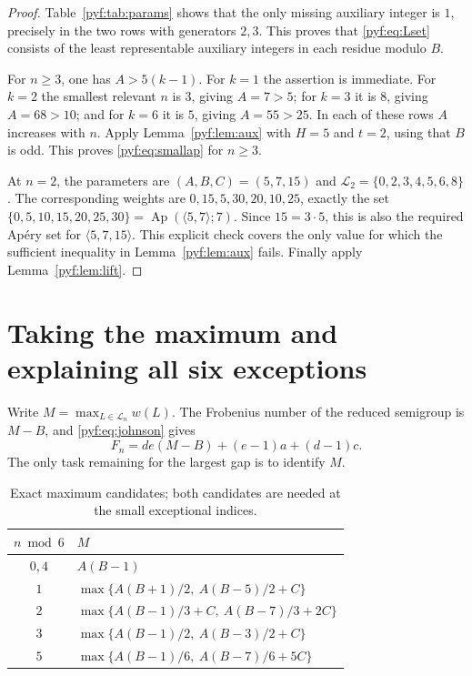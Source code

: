 \documentclass[11pt,a4paper]{article}
\numberwithin{equation}{section}
\theoremstyle{definition}
\newcommand{\Ap}{\operatorname{Ap}}
\begin{document}
\begin{proof}
Table~\ref{pyf:tab:params} shows that the only missing auxiliary integer is
$1$, precisely in the two rows with generators $2,3$. This proves that
\eqref{pyf:eq:Lset} consists of the least representable auxiliary integers in
each residue modulo $B$.

For $n\geq3$, one has $A>5(k-1)$. For $k=1$ the assertion is immediate.
For $k=2$ the smallest relevant $n$ is $3$, giving $A=7>5$; for $k=3$
it is $8$, giving $A=68>10$; and for $k=6$ it is $5$, giving
$A=55>25$. In each of these rows $A$ increases with $n$.
Apply Lemma~\ref{pyf:lem:aux} with $H=5$ and $t=2$, using that $B$ is odd.
This proves \eqref{pyf:eq:smallap} for $n\geq3$.

At $n=2$, the parameters are $(A,B,C)=(5,7,15)$ and
$\mathcal L_2=\{0,2,3,4,5,6,8\}$. The corresponding weights are
$0,15,5,30,20,10,25$, exactly the set
$\{0,5,10,15,20,25,30\}=\Ap(\langle5,7\rangle;7)$.
Since $15=3\cdot5$, this is also the required Ap\'ery set for
$\langle5,7,15\rangle$. This explicit check covers the only value for
which the sufficient inequality in Lemma~\ref{pyf:lem:aux} fails.
Finally apply Lemma~\ref{pyf:lem:lift}.
\end{proof}

\section{Taking the maximum and explaining all six exceptions}\label{pyf:sec:max}

Write $M=\max_{L\in\mathcal L_n}w(L)$. The Frobenius number of the reduced
semigroup is $M-B$, and \eqref{pyf:eq:johnson} gives
\begin{equation}\label{pyf:eq:FfromM}
F_n=de(M-B)+(e-1)a+(d-1)c.
\end{equation}
The only task remaining for the largest gap is to identify $M$.

\begin{table}[ht]
\centering
\caption{Exact maximum candidates; both candidates are needed at the small
exceptional indices.}\label{pyf:tab:max}
\begin{tabular}{cp{}}
\toprule
$n\bmod6$ & $M$\\
\midrule
$0,4$ & $A(B-1)$\\[4pt]
$1$ & $\max\{A(B+1)/2,\ A(B-5)/2+C\}$\\[4pt]
$2$ & $\max\{A(B-1)/3+C,\ A(B-7)/3+2C\}$\\[4pt]
$3$ & $\max\{A(B-1)/2,\ A(B-3)/2+C\}$\\[4pt]
$5$ & $\max\{A(B-1)/6,\ A(B-7)/6+5C\}$\\
\bottomrule
\end{tabular}
\end{table}
\end{document}
